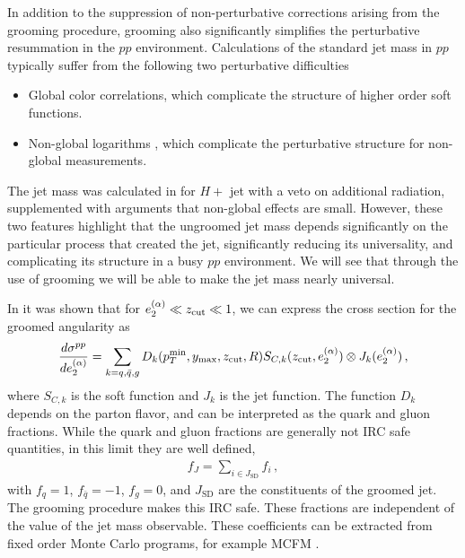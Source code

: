 In addition to the suppression of non-perturbative corrections arising from the grooming procedure, grooming also significantly simplifies the perturbative resummation in the $pp$ environment. Calculations of the standard jet mass in $pp$ typically suffer from the following two perturbative difficulties
\begin{itemize}
\item Global color correlations, which complicate the structure of higher order soft functions.
\item Non-global logarithms \cite{Dasgupta:2001sh}, which complicate the perturbative structure for non-global measurements.
\end{itemize}
The jet mass was calculated in \cite{Jouttenus:2013hs} for $H+$ jet with a veto on additional radiation, supplemented with arguments that non-global effects are small. However, these two features highlight that the ungroomed jet mass depends significantly on the particular process that created the jet, significantly reducing its universality, and complicating its structure in a busy $pp$ environment. We will see that through the use of grooming we will be able to make the jet mass nearly universal.


In  it was shown that for $e_{2}^{(\alpha)} \ll z_{\rm cut} \ll 1$,  we can express the cross section for the groomed angularity as
\begin{align}\label{eq:fac_pp_e2}
\frac{d\sigma^{pp}}{de_{2}^{(\alpha)}}=\sum\limits_{k=q,\bar q, g}D_k(p_T^{\text{min}}, y_\text{max}, z_{\rm cut}, R) S_{C,k}(z_{\rm cut}, e_{2}^{(\alpha)})\otimes J_k (e_{2}^{(\alpha)})\,,
\end{align}
\noindent where $S_{C,k}$ is the soft function and $J_k$ is the jet function.  The function $D_k$ depends on the parton flavor, and can be interpreted as the quark and gluon fractions. While the quark and gluon fractions are generally not IRC safe quantities, in this limit they are well defined, 
\begin{align}
f_J=\sum\limits_{i\in J_{\text{SD}}} f_i\,,
\end{align}
with $f_q=1$, $f_{\bar q}=-1$, $f_g=0$, and $J_{\text{SD}}$ are the constituents of the groomed jet. The grooming procedure makes this IRC safe. These fractions are independent of the value of the jet mass observable. These coefficients can be extracted from fixed order Monte Carlo programs, for example MCFM \cite{Campbell:1999ah,Campbell:2010ff,Campbell:2011bn}.



